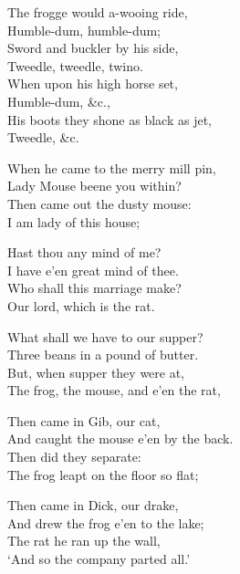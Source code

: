 \smallskip



\settowidth{\versewidth}{The frogge would a-wooing ride,}

\begin{dcverse}The frogge would a-wooing ride,\\
\hspace{4em}Humble-dum, humble-dum;\\
Sword and buckler by his side,\\
\hspace{4em}Tweedle, tweedle, twino.\\
When upon his high horse set,\\
\hspace{4em}Humble-dum, \&c.,\\
His boots they shone as black as jet,\\
\hspace{4em}Tweedle, \&c.

When he came to the merry mill pin,\\
Lady Mouse beene you within?\\
Then came out the dusty mouse:\\
I am lady of this house;\columnbreak

Hast thou any mind of me?\\
I have e’en great mind of thee.\\
Who shall this marriage make?\\
Our lord, which is the rat.

What shall we have to our supper?\\
Three beans in a pound of butter.\\
But, when supper they were at,\\
The frog, the mouse, and e’en the rat,

Then came in Gib, our cat,\\
And caught the mouse e’en by the back.\\
Then did they separate:\\
The frog leapt on the floor so flat;
\end{dcverse}


\begin{scverse}\smallskip
Then came in Dick, our drake,\\
And drew the frog e’en to the lake;\\
The rat he ran up the wall,\\
‘And so the company parted all.’
\end{scverse}

